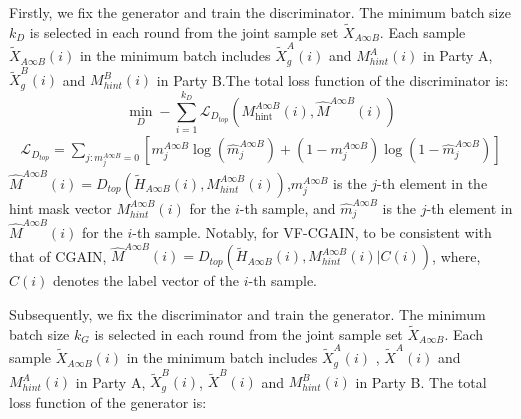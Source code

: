 \documentclass[final,1p,times]{elsarticle}
\begin{document}
Firstly, we fix the generator and train the discriminator. The minimum batch size $k_{D}$ is selected in each round from the joint sample set $\tilde{X}_{A\infty B}$. Each sample $\tilde{X}_{A\infty B}(i)$ in the minimum batch includes $\tilde{X}_{g}^{A}(i)$ and $M_{hint}^A(i)$ in Party A, $\tilde{X}_{g}^{B}(i)$ and $M_{hint}^B(i)$ in Party B.The total loss function of the discriminator is:
\begin{equation}
	\min_D  -\sum_{i=1}^{k_D} \mathcal{L}_{D_{top}} \left( M_{\text{hint}}^{A\infty B}(i), \hat{M}^{A\infty B}(i) \right)
\end{equation}
\begin{equation}
	\begin{split}
		\mathcal{L}_{D_{top}} = \sum_{j: m_j^{A \infty B}=0} [ m_j^{A \infty B} \log\left(\hat{m}_j^{A \infty B}\right) + (1-m_j^{A \infty B}) \log\left(1-\hat{m}_j^{A \infty B}\right) ]
	\end{split}
\end{equation}
$\hat{M}^{A\infty B}(i)=D_{top}(\widetilde{H}_{A\infty B}(i),M_{hint}^{A\infty B}(i))$,$m_{j}^{A\infty B}$ is the $j$-th element in the hint mask vector $M_{hint}^{A\infty B}(i)$ for the $i$-th sample, and $\hat{m}_{j}^{A\infty B}$ is the $j$-th element in $\hat{M}^{A\infty B}(i)$ for the $i$-th sample. Notably, for VF-CGAIN, to be consistent with that of CGAIN, $\hat{M}^{A\infty B}(i)=D_{top}(\widetilde{H}_{A\infty B}(i),M_{hint}^{A\infty B}(i)|C(i))$, where, $C(i)$ denotes the label vector of the $i$-th sample.

Subsequently, we fix the discriminator and train the generator. The minimum batch size $k_{G}$ is selected in each round from the joint sample set $\tilde{X}_{A\infty B}$. Each sample $\tilde{X}_{A\infty B}(i)$ in the minimum batch includes $\tilde{X}_{g}^{A}(i)$ , $\tilde{X}^{A}(i)$ and $M_{hint}^A(i)$ in Party A, $\tilde{X}_{g}^{B}\left(i\right)$, $\tilde{X}^{B}(i)$ and $M_{hint}^B(i)$ in Party B.
The total loss function of the generator is:
\end{document}
